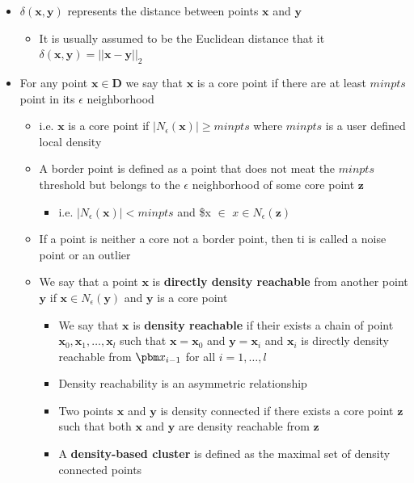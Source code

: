 \documentclass[11pt]{article}
\begin{document}
\begin{itemize}
\item \(\delta(\pmb x, \pmb y)\) represents the distance between points \(\pmb x\) and \(\pmb y\)
\begin{itemize}
\item It is usually assumed to be the Euclidean distance that it \(\delta(\pmb x, \pmb y) = || \pmb x - \pmb y||_ 2\)
\end{itemize}

\item For any point \(\pmb x \in \mathbf D\) we say that \(\pmb x\) is a core point if there are at least \(minpts\) point in its \(\epsilon\) neighborhood
\begin{itemize}
\item i.e. \(\pmb x\) is a core point if \(|N_\epsilon(\pmb x) | \geq minpts\) where \(minpts\) is a user defined local density
\item A border point is defined as a point that does not meat the \(minpts\) threshold but belongs to the \(\epsilon\) neighborhood of some core point \(\pmb z\)
\begin{itemize}
\item i.e. \(|N_\epsilon(\pmb x) | < minpts\) and \$x \(\in\) \(x \in N_\epsilon(\pmb z)\)
\end{itemize}
\item If a point is neither a core not a border point, then ti is called a noise point or an outlier
\item We say that a point \(\pmb x\) is \textbf{directly density reachable} from another point \(\pmb y\) if \(\pmb x \in N_\epsilon(\pmb y)\) and \(\pmb y\) is a core point
\begin{itemize}
\item We say that \(\pmb x\) is \textbf{density reachable} if their exists a chain of point \(\pmb x_0, \pmb x_1, \dots, \pmb x_l\) such that \(\pmb x = \pmb x_0\) and \(\pmb y = \pmb x_i\) and \(\pmb x_i\) is directly density reachable from \(\pbm x_{i-1}\) for all \(i=1, \dots,l\)
\item Density reachability is an asymmetric relationship
\item Two points \(\pmb x\) and \(\pmb y\) is density connected if there exists a core point \(\pmb z\) such that both \(\pmb x\) and \(\pmb y\) are density reachable from \(\pmb z\)
\item A \textbf{density-based cluster} is defined as the maximal set of density connected points
\end{itemize}
\end{itemize}
\end{itemize}
\end{document}

